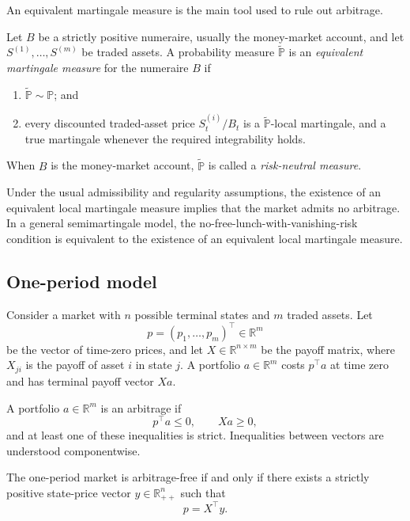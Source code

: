 An equivalent martingale measure is the main tool used to rule out arbitrage.

\begin{de}
Let $B$ be a strictly positive numeraire, usually the money-market account, and let $S^{(1)},\ldots,S^{(m)}$ be traded assets. A probability measure $\widetilde{\mathbb{P}}$ is an \emph{equivalent martingale measure} for the numeraire $B$ if
\begin{enumerate}
    \item $\widetilde{\mathbb{P}}\sim\mathbb{P}$; and
    \item every discounted traded-asset price $S_t^{(i)}/B_t$ is a $\widetilde{\mathbb{P}}$-local martingale, and a true martingale whenever the required integrability holds.
\end{enumerate}
When $B$ is the money-market account, $\widetilde{\mathbb{P}}$ is called a \emph{risk-neutral measure}.
\end{de}

\begin{thm}
Under the usual admissibility and regularity assumptions, the existence of an equivalent local martingale measure implies that the market admits no arbitrage. In a general semimartingale model, the no-free-lunch-with-vanishing-risk condition is equivalent to the existence of an equivalent local martingale measure.
\end{thm}

\subsection{One-period model}

Consider a market with $n$ possible terminal states and $m$ traded assets. Let
\[
p=(p_1,\ldots,p_m)^\top\in\mathbb{R}^m
\]
be the vector of time-zero prices, and let $X\in\mathbb{R}^{n\times m}$ be the payoff matrix, where $X_{ji}$ is the payoff of asset $i$ in state $j$. A portfolio $a\in\mathbb{R}^m$ costs $p^\top a$ at time zero and has terminal payoff vector $Xa$.

\begin{de}
A portfolio $a\in\mathbb{R}^m$ is an arbitrage if
\[
p^\top a\leq 0,
\qquad
Xa\geq 0,
\]
and at least one of these inequalities is strict. Inequalities between vectors are understood componentwise.
\end{de}

\begin{thm}
The one-period market is arbitrage-free if and only if there exists a strictly positive state-price vector $y\in\mathbb{R}_{++}^n$ such that
\[
p=X^\top y.
\]
\end{thm}

